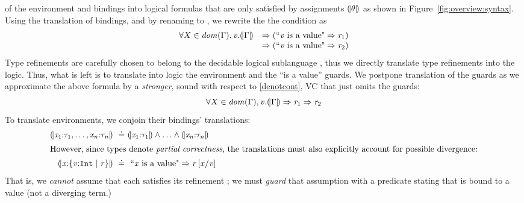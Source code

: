 of the environment and bindings into logical formulas 
that are only satisfied by assignments $(\!|\theta|\!)$
as shown in Figure~\ref{fig:overview:syntax}.
%
Using the translation of bindings, 
and by renaming \x to \vv,
we rewrite the the condition as
$$
\begin{array}{rl}
\forall X \in \mathit{dom}(\Gamma), \mathit{v}. 
    (\!|\Gamma|\!)
    &\Rightarrow
     ({\text{``}\mathit{v}\ \text{is a value"}}  \Rightarrow \mathit{r}_1)\\
    &\Rightarrow
     ({\text{``}\mathit{v}\ \text{is a value"}}  \Rightarrow \mathit{r}_2)
\end{array}
$$
Type refinements are carefully chosen to belong to the 
decidable logical sublanguage \logiclang, thus we directly translate
type refinements into the logic.
%
Thus, what is left is to translate into logic the environment and the ``is a value'' guards.
%
We postpone translation of the guards as we approximate the above formula by 
a \emph{stronger}, \ie sound with respect to \ref{denotcont},
VC that just omits the guards:
$$
\forall X \in \mathit{dom}(\Gamma), \mathit{v}. 
    (\!|\Gamma|\!)
    \Rightarrow
      \mathit{r}_1 \Rightarrow \mathit{r}_2
$$
%
To translate environments, we conjoin their bindings' translations:
\begin{align*}
%
\embed{\ttbind{\x_1}{\typ_1},\ldots,\ttbind{\x_\n}{\typ_\n}} \defeq & 
\embed{\ttbind{\x_1}{\typ_1}} \wedge \ldots \wedge \embed{\ttbind{\x_\n}{\typ_\n}} \\
%
\intertext{However, since types denote \emph{partial correctness},
   the translations must also explicitly account for possible divergence:}
\embed{\ttbind{\x}{\tlref{\vv}{\tint}{}{\refi}}} \defeq & \ \mbox{``$\x$ is a value"}  \Rightarrow \SUBST{\lref}{\vv}{\x}
\end{align*}
%
That is, we \emph{cannot} assume that each \x satisfies its 
refinement ; we must \emph{guard} that assumption with a 
predicate stating that \x is bound to a value (not a diverging term.)

